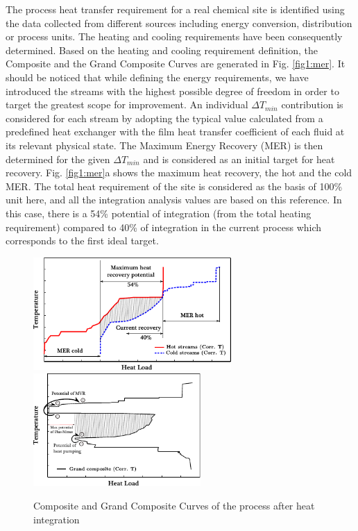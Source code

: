 The process heat transfer requirement for a real chemical site is identified using the data collected from different sources including energy conversion, distribution or process units. The heating and cooling requirements have been consequently determined. Based on the heating and cooling requirement definition, the Composite and the Grand Composite Curves are generated in Fig. \ref{fig1:mer}. It should be noticed that while defining the energy requirements, we have introduced the streams with the highest possible degree of freedom in order to target the greatest scope for improvement. An individual $\Delta T_{min}$ contribution is considered for each stream by adopting the typical value calculated from a predefined heat exchanger with the film heat transfer coefficient of each fluid at its relevant physical state. The Maximum Energy Recovery (MER) is then determined for the given $\Delta T_{min}$ and is considered as an initial target for heat recovery. Fig. \ref{fig1:mer}a shows the maximum heat recovery, the hot and the cold MER. The total heat requirement of the site is considered as the basis of 100\% unit here, and all the integration analysis values are based on this reference. In this case, there is a 54\% potential of integration (from the total heating requirement) compared to 40\% of integration in the current process which corresponds to the first ideal target.


        \begin{figure}[h]
        \begin{center}
        \includegraphics [height=4.3cm]{figures/HeatIntegration/figMERcc.pdf} 
        \includegraphics [height=4.3cm]{figures/HeatIntegration/figMERgcc.pdf}
        \caption{Composite and Grand Composite Curves of the process after heat integration}
        \end{center}
        \end{figure}
        \label{fig1:mer}
        

